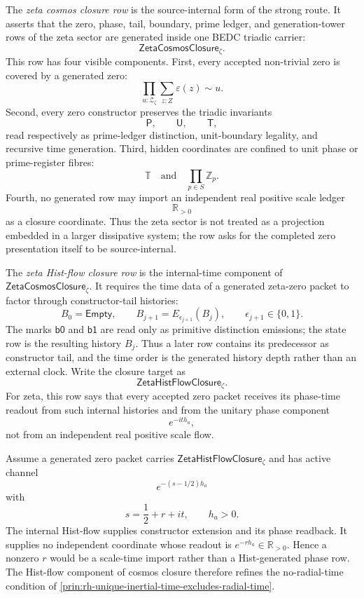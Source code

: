\begin{definition}
\label{def:rh-zeta-cosmos-closure-row}
The \emph{zeta cosmos closure row} is the source-internal form of the
strong route. It asserts that the zero, phase, tail, boundary, prime
ledger, and generation-tower rows of the zeta sector are generated inside
one BEDC triadic carrier:
$$
\mathsf{ZetaCosmosClosure}_{\zeta}.
$$
This row has four visible components. First, every accepted non-trivial
zero is covered by a generated zero:
$$
\prod_{u:\mathcal Z_{\zeta}}
\sum_{z:Z}\varepsilon(z)\sim u.
$$
Second, every zero constructor preserves the triadic invariants
$$
\mathsf P,\qquad \mathsf U,\qquad \mathsf T,
$$
read respectively as prime-ledger distinction, unit-boundary legality,
and recursive time generation. Third, hidden coordinates are confined to
unit phase or prime-register fibres:
$$
\mathbb T
\quad\text{and}\quad
\prod_{p\in S}\mathbb Z_p.
$$
Fourth, no generated row may import an independent real positive scale
ledger
$$
\mathbb R_{>0}
$$
as a closure coordinate. Thus the zeta sector is not treated as a
projection embedded in a larger dissipative system; the row asks for the
completed zero presentation itself to be source-internal.
\end{definition}

\begin{definition}
\label{def:rh-zeta-hist-flow-closure-row}
The \emph{zeta Hist-flow closure row} is the internal-time component of
$\mathsf{ZetaCosmosClosure}_{\zeta}$. It requires the time data of a
generated zeta-zero packet to factor through constructor-tail histories:
$$
B_0=\mathsf{Empty},
\qquad
B_{j+1}=E_{\epsilon_{j+1}}(B_j),
\qquad
\epsilon_{j+1}\in\{0,1\}.
$$
The marks $\mathsf{b0}$ and $\mathsf{b1}$ are read only as primitive
distinction emissions; the state row is the resulting history $B_j$.
Thus a later row contains its predecessor as constructor tail, and the
time order is the generated history depth rather than an external clock.
Write the closure target as
$$
\mathsf{ZetaHistFlowClosure}_{\zeta}.
$$
For zeta, this row says that every accepted zero packet receives its
phase-time readout from such internal histories and from the unitary
phase component
$$
e^{-it h_a},
$$
not from an independent real positive scale flow.
\end{definition}

\begin{principle}
\label{prin:rh-hist-flow-closure-rejects-scale-time}
Assume a generated zero packet carries
$\mathsf{ZetaHistFlowClosure}_{\zeta}$ and has active channel
$$
e^{-(s-1/2)h_a}
$$
with
$$
s=\frac12+r+it,
\qquad
h_a>0.
$$
The internal Hist-flow supplies constructor extension and its phase
readback. It supplies no independent coordinate whose readout is
$e^{-r h_a}\in\mathbb R_{>0}$. Hence a nonzero $r$ would be a scale-time
import rather than a Hist-generated phase row. The Hist-flow component of
cosmos closure therefore refines the no-radial-time condition of
\autoref{prin:rh-unique-inertial-time-excludes-radial-time}.
\end{principle}

